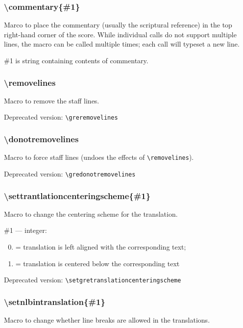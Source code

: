 \subsubsection*{\textbackslash commentary\{\#1\}}
Marco to place the commentary (usually the scriptural reference) in
the top right-hand corner of the score.  While individual calls do not
support multiple lines, the macro can be called multiple times; each
call will typeset a new line.

\#1 is string containing contents of commentary.

\subsubsection*{\textbackslash removelines}	
Macro to remove the staff lines.

\smallskip\indent Deprecated version: \verb=\greremovelines=

\subsubsection*{\textbackslash donotremovelines}
Macro to force staff lines (undoes the effects of
\verb=\removelines=).

\smallskip\indent Deprecated version: \verb=\gredonotremovelines=

\subsubsection*{\textbackslash settrantlationcenteringscheme\{\#1\}}
Macro to change the centering scheme for the translation.

\noindent\#1 --- integer:

\begin{enumerate}[label=\arabic* =]\setcounter{enumi}{-1}
 \item = translation is left aligned with the corresponding text;
 \item = translation is centered below the corresponding text
\end{enumerate}

\smallskip\indent Deprecated version: \verb=\setgretranslationcenteringscheme=

\subsubsection*{\textbackslash setnlbintranslation\{\#1\}}
Macro to change whether line breaks are allowed in the translations.

